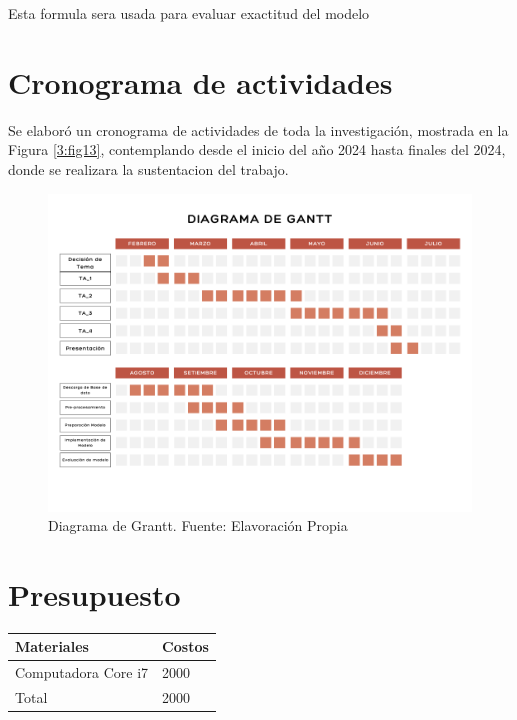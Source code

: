 Esta formula sera usada para evaluar exactitud del modelo





\section{Cronograma de actividades}

Se elaboró un cronograma de actividades de toda la investigación, mostrada en la Figura \ref{3:fig13}, contemplando desde el inicio del año 2024 hasta finales del 2024, donde se realizara la sustentacion del trabajo.

\begin{figure}[h]
	\begin{center}
		\includegraphics[width=1\textwidth]{3/figures/Cronograma Diagrama de Gantt.png}
		\caption{Diagrama de Grantt. Fuente: Elavoración Propia }
		\label{1:fig 18}
	\end{center}
\end{figure}




\section{Presupuesto}

\begin{center}
	\begin{tabular}{|p{8cm}|p{3cm}|}
		\hline
		Materiales & Costos  \\
		\hline
		Computadora Core i7 & 2000 \\
		\hline

		Total & 2000 \\
		\hline
	\end{tabular}
\end{center}


